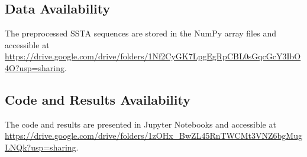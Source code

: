 \documentclass[11pt, a4paper]{article}
\def\UrlBreaks{\do\/\do-}
\begin{document}
\subsection{Data Availability}\label{apd:data}

\def\UrlBreaks{\do\/\do-}
\sloppy

The preprocessed SSTA sequences are stored in the NumPy array files and accessible at \url{https://drive.google.com/drive/folders/1Nf2CyGK7LpgEgRpCBL0sGqcGcY3IbO4O?usp=sharing}.

\subsection{Code and Results Availability}\label{apd:code}

The code and results are presented in Jupyter Notebooks and accessible at \url{https://drive.google.com/drive/folders/1zOHx_BwZL45RnTWCMt3VNZ6bgMugLNQk?usp=sharing}.
\end{document}
